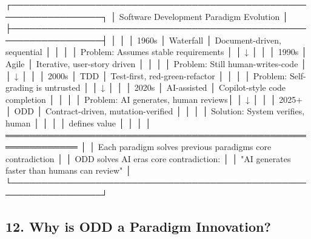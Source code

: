\documentclass[
]{article}
\newenvironment{Shaded}{}{}
\newcommand{\NormalTok}[1]{#1}
\begin{document}
\begin{Shaded}
\begin{Highlighting}[]
\NormalTok{┌─────────────────────────────────────────────────────────────────┐}
\NormalTok{│          Software Development Paradigm Evolution                 │}
\NormalTok{├─────────────────────────────────────────────────────────────────┤}
\NormalTok{│                                                                  │}
\NormalTok{│  1960s    │ Waterfall    │ Document{-}driven, sequential          │}
\NormalTok{│           │              │ Problem: Assumes stable requirements │}
\NormalTok{│           ↓              │                                       │}
\NormalTok{│  1990s    │ Agile        │ Iterative, user{-}story driven        │}
\NormalTok{│           │              │ Problem: Still human{-}writes{-}code    │}
\NormalTok{│           ↓              │                                       │}
\NormalTok{│  2000s    │ TDD          │ Test{-}first, red{-}green{-}refactor      │}
\NormalTok{│           │              │ Problem: Self{-}grading is untrusted  │}
\NormalTok{│           ↓              │                                       │}
\NormalTok{│  2020s    │ AI{-}assisted  │ Copilot{-}style code completion       │}
\NormalTok{│           │              │ Problem: AI generates, human reviews│}
\NormalTok{│           ↓              │                                       │}
\NormalTok{│  2025+    │ ODD          │ Contract{-}driven, mutation{-}verified  │}
\NormalTok{│           │              │ Solution: System verifies, human    │}
\NormalTok{│           │              │           defines value              │}
\NormalTok{│                                                                  │}
\NormalTok{│  ══════════════════════════════════════════════════════════════  │}
\NormalTok{│  Each paradigm solves previous paradigm\textquotesingle{}s core contradiction    │}
\NormalTok{│  ODD solves AI era\textquotesingle{}s core contradiction:                        │}
\NormalTok{│  "AI generates faster than humans can review"                   │}
\NormalTok{└─────────────────────────────────────────────────────────────────┘}
\end{Highlighting}
\end{Shaded}

\hypertarget{12-why-is-odd-a-paradigm-innovation}{%
\subsection{12. Why is ODD a Paradigm
Innovation?}\label{12-why-is-odd-a-paradigm-innovation}}
\end{document}
